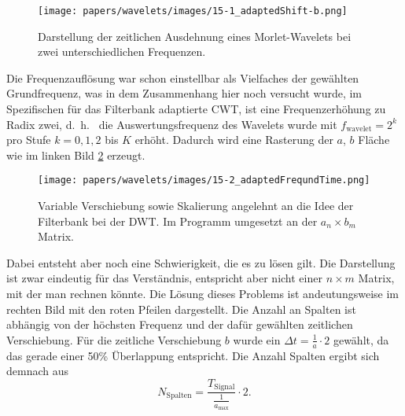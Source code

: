 \begin{figure}
	\centering
	\texttt{[image: papers/wavelets/images/15-1\_adaptedShift-b.png]}
	\caption{Darstellung der zeitlichen Ausdehnung eines Morlet-Wavelets
	bei zwei unterschiedlichen Frequenzen.}
	\label{wavelet:fig:adaptedShift_b}
\end{figure}

Die Frequenzauflösung war schon einstellbar als Vielfaches der
gewählten Grundfrequenz, was in dem Zusammenhang hier noch versucht
wurde, im Spezifischen für das Filterbank adaptierte CWT, ist eine
Frequenzerhöhung zu Radix zwei, d.~h.~ die Auswertungsfrequenz des
Wavelets wurde mit $f_\text{wavelet} = 2^k$ pro Stufe $k = 0, 1,
2$ bis $K$ erhöht.
Dadurch wird eine Rasterung der $a$, $b$ Fläche wie im linken Bild
\ref{wavelet:fig:adaptedFrequndTime} erzeugt.

\begin{figure}
	\centering
	\texttt{[image: papers/wavelets/images/15-2\_adaptedFrequndTime.png]}
	\caption{Variable Verschiebung sowie Skalierung angelehnt an die Idee der Filterbank bei der DWT.
Im Programm umgesetzt an der $a_n \times b_m$ Matrix.}
	\label{wavelet:fig:adaptedFrequndTime}
\end{figure}

Dabei entsteht aber noch eine Schwierigkeit, die es zu lösen gilt.
Die Darstellung ist zwar eindeutig für das Verständnis, entspricht
aber nicht einer $n \times m$ Matrix, mit der man rechnen könnte.
Die Lösung dieses Problems ist andeutungsweise im rechten Bild mit
den roten Pfeilen dargestellt.
Die Anzahl an Spalten ist abhängig von der höchsten Frequenz und
der dafür gewählten zeitlichen Verschiebung.
Für die zeitliche Verschiebung $b$ wurde ein $\Delta t=\frac{1}{a}\cdot2$
gewählt, da das gerade einer 50\% Überlappung entspricht.
Die Anzahl Spalten ergibt sich demnach aus
\begin{equation}
	N_\text{Spalten}=\frac{T_\text{Signal}}{\frac{1}{a_\text{max}}}\cdot2.
	\label{wavelets:equation7}
\end{equation}


